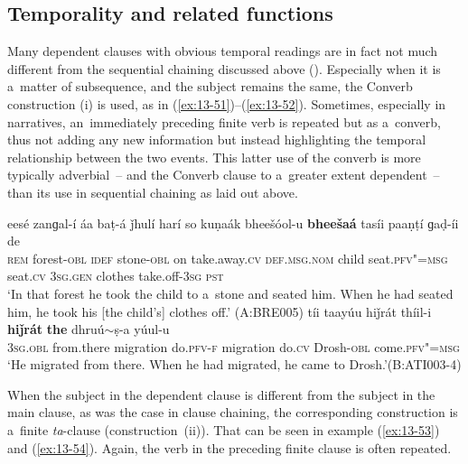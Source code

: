 \subsection{Temporality and related functions}
\label{subsec:13-4-1}

 Many dependent clauses with obvious temporal readings are in fact not much different from the sequential chaining discussed above (). Especially when it is a~matter of subsequence, and the subject remains the same, the Converb construction (i) is used, as in (\ref{ex:13-51})--(\ref{ex:13-52}). Sometimes, especially in narratives, an~immediately preceding finite verb is repeated but as a~converb, thus not adding any new information but instead highlighting the temporal relationship between the two events. This latter use of the converb is more typically adverbial~-- and the Converb clause to a~greater extent dependent~-- than its use in sequential chaining as laid out above.

\ea
\label{ex:13-51}
\gll eesé zanɡal-í áa baṭ-á ǰhulí harí so kuṇaák bheešóol-u \textbf{bheešaá} tasíi paaṇṭí ɡaḍ-íi de \\
\textsc{rem} forest-\textsc{obl} \textsc{idef} stone-\textsc{obl} on take.away.\textsc{cv}   \textsc{def.msg.nom} child seat.\textsc{pfv"=msg} seat.\textsc{cv} \textsc{3sg.gen} clothes take.off-\textsc{3sg} \textsc{pst}\\
\glt `In that forest he took the child to a~stone and seated him. When he had seated him, he took his [the child's] clothes off.' (A:BRE005)
\ex
\label{ex:13-52}
\gll tíi taayúu hiǰrát thíil-i \textbf{hiǰrát} \textbf{the} dhruú$\sim$ṣ-a yúul-u\\
\textsc{3sg.obl} from.there migration do.\textsc{pfv-f} migration do.\textsc{cv} Drosh-\textsc{obl} come.\textsc{pfv"=msg}\\
\glt `He migrated from there. When he had migrated, he came to Drosh.'\newline (B:ATI003-4) 
\z

When the subject in the dependent clause is different from the subject in the main clause, as was the case in clause chaining, the corresponding construction is a~finite \textit{ta}-clause (construction~(ii)). That can be seen in example (\ref{ex:13-53}) and (\ref{ex:13-54}). Again, the verb in the preceding finite clause is often repeated.

